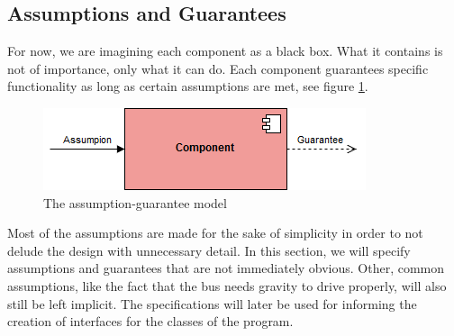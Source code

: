 \subsection{Assumptions and Guarantees}
For now, we are imagining each component as a black box. What it contains is not of importance, only what it can do. Each component guarantees specific functionality as long as certain assumptions are met, see figure \ref{fig:assumptionGuarantee}. 

\begin{figure}[ht]
    \includegraphics[width=\textwidth]{Images/assumptionGuarantee.png}
    \caption{The assumption-guarantee model}
    \label{fig:assumptionGuarantee}
\end{figure}

Most of the assumptions are made for the sake of simplicity in order to not delude the design with unnecessary detail. In this section, we will specify assumptions and guarantees that are not immediately obvious. Other, common assumptions, like the fact that the bus needs gravity to drive properly, will also still be left implicit. The specifications will later be used for informing the creation of interfaces for the classes of the program. 


